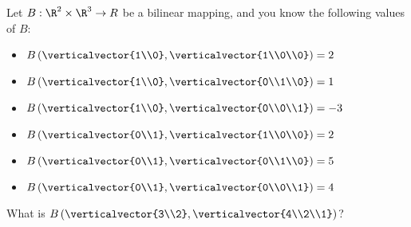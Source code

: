 \documentclass{ximera}
\begin{document}
	
\begin{question}
  Let  $B:\R^2 \times \R^3 \to R$ be a bilinear mapping, and you know the following values of $B$:
  \begin{itemize}
  \item $B\left(\verticalvector{1\\0},\verticalvector{1\\0\\0}\right) = 2$
  \item $B\left(\verticalvector{1\\0},\verticalvector{0\\1\\0}\right) = 1$
  \item $B\left(\verticalvector{1\\0},\verticalvector{0\\0\\1}\right) = -3$
  \item $B\left(\verticalvector{0\\1},\verticalvector{1\\0\\0}\right) = 2$
  \item $B\left(\verticalvector{0\\1},\verticalvector{0\\1\\0}\right) = 5$
  \item $B\left(\verticalvector{0\\1},\verticalvector{0\\0\\1}\right) = 4$ 
  \end{itemize}
			
  What is $B\left(\verticalvector{3\\2},\verticalvector{4\\2\\1}\right)$?
			

\end{question}
\end{document}
